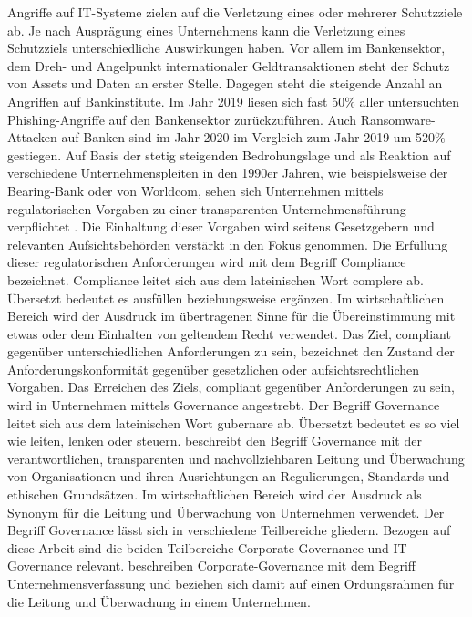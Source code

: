 \bigbreak
Angriffe auf IT-Systeme zielen auf die Verletzung eines oder mehrerer Schutzziele ab. Je nach Ausprägung eines Unternehmens kann die Verletzung eines Schutzziels unterschiedliche Auswirkungen haben. Vor allem im Bankensektor, dem Dreh- und Angelpunkt internationaler Geldtransaktionen steht der Schutz von Assets und Daten an erster Stelle. 
\bigbreak
Dagegen steht die steigende Anzahl an Angriffen auf Bankinstitute. Im Jahr 2019 liesen sich fast 50\% aller untersuchten Phishing-Angriffe auf den Bankensektor zurückzuführen. Auch Ransomware-Attacken auf Banken sind im Jahr 2020 im Vergleich zum Jahr 2019 um 520\% gestiegen. \autocite{crosman_2020}
\bigbreak
Auf Basis der stetig steigenden Bedrohungslage und als  Reaktion auf verschiedene Unternehmenspleiten in den 1990er Jahren, wie beispielsweise der Bearing-Bank oder von Worldcom, sehen sich Unternehmen mittels regulatorischen Vorgaben zu einer transparenten Unternehmensführung verpflichtet \autocite{capital_2022} \autocite{capital_20222}. Die Einhaltung dieser Vorgaben wird seitens Gesetzgebern und relevanten Aufsichtsbehörden verstärkt in den Fokus genommen. 
\bigbreak
Die Erfüllung dieser regulatorischen Anforderungen wird mit dem Begriff \glqq{}Compliance\grqq{} bezeichnet. Compliance leitet sich aus dem lateinischen Wort \glqq{}complere\grqq{} ab. Übersetzt bedeutet es ausfüllen beziehungsweise ergänzen. Im wirtschaftlichen Bereich wird der Ausdruck im übertragenen Sinne für die Übereinstimmung mit etwas oder dem Einhalten von geltendem Recht verwendet. Das Ziel, compliant gegenüber unterschiedlichen Anforderungen zu sein, bezeichnet den Zustand der Anforderungskonformität gegenüber gesetzlichen oder aufsichtsrechtlichen Vorgaben. Das Erreichen des Ziels, compliant gegenüber Anforderungen zu sein, wird in Unternehmen mittels \glqq{}Governance\grqq{} angestrebt. Der Begriff Governance leitet sich aus dem lateinischen Wort \glqq{}gubernare\grqq{} ab. Übersetzt bedeutet es so viel wie leiten, lenken oder steuern.  \autocite{FalkMichael2012IidC} 
\bigbreak
\textcite{JohannsenWolfgang2011RfI:} beschreibt den Begriff Governance mit der \glqq{}verantwortlichen, transparenten und nachvollziehbaren Leitung und Überwachung von Organisationen und ihren Ausrichtungen an Regulierungen, Standards und ethischen Grundsätzen\grqq{}. Im wirtschaftlichen Bereich wird der Ausdruck als Synonym für die Leitung und Überwachung von Unternehmen verwendet. Der Begriff Governance lässt sich in verschiedene Teilbereiche gliedern. Bezogen auf diese Arbeit sind die beiden Teilbereiche Corporate-Governance und IT-Governance relevant. \textcite{hauschka} beschreiben Corporate-Governance mit dem Begriff \glqq{}Unternehmensverfassung\grqq{} und beziehen sich damit auf einen Ordungsrahmen für die Leitung und Überwachung in einem Unternehmen. 
